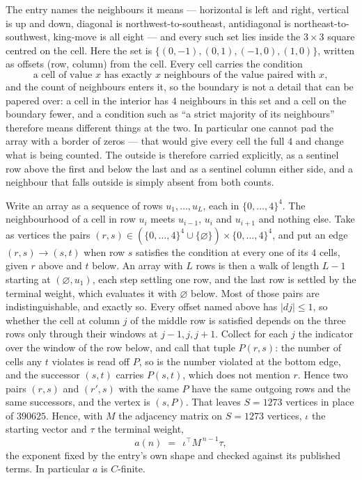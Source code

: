 \documentclass[11pt,a4paper]{article}
\theoremstyle{plain}
\theoremstyle{definition}
\begin{document}
The entry names the neighbours it means --- horizontal is left and right, vertical is up and
down, diagonal is northwest-to-southeast, antidiagonal is northeast-to-southwest, king-move is
all eight --- and every such set lies inside the $3\times3$ square centred on the cell. Here
the set is $\{(0,-1), (0,1), (-1,0), (1,0)\}$, written as offsets (row, column) from the cell. Every cell carries
the condition
\[
\text{a cell of value }x\text{ has exactly }x\text{ neighbours of the value paired with }x,
\]
and the count of neighbours enters it, so the boundary is not a detail that can be papered
over: a cell in the interior has $4$ neighbours in this set and a cell on the boundary
fewer, and a condition such as ``a strict majority of its neighbours'' therefore means
different things at the two. In particular one cannot pad the array with a border of zeros ---
that would give every cell the full $4$ and change what is being counted. The outside is
therefore carried
explicitly, as a sentinel row above the first and below the last and as a sentinel column
either side, and a neighbour that falls outside is simply absent from both counts.

Write an array as a sequence of rows $u_1,\dots,u_L$, each in
$\{0,\dots,4\}^{4}$. The neighbourhood of a cell in row $u_i$ meets $u_{i-1}$,
$u_i$ and $u_{i+1}$ and nothing else. Take as vertices the pairs
$(r,s)\in(\{0,\dots,4\}^{4}\cup\{\varnothing\})\times\{0,\dots,4\}^{4}$,
and put an edge $(r,s)\to(s,t)$ when row $s$ satisfies the condition at every one of its
$4$ cells, given $r$ above and $t$ below. An array with $L$ rows is then a walk of length
$L-1$ starting at $(\varnothing,u_1)$, each step settling one row, and the last row is
settled by the terminal weight, which evaluates it with $\varnothing$ below. Most of those pairs are indistinguishable, and exactly so. Every offset named above has $|dj|\le 1$, so whether the cell at column $j$ of the middle row is satisfied depends on the three rows only through their windows at $j-1,j,j+1$. Collect for each $j$ the indicator over the window of the row below, and call that tuple $P(r,s)$: the number of cells any $t$ violates is read off $P$, so is the number violated at the bottom edge, and the successor $(s,t)$ carries $P(s,t)$, which does not mention $r$. Hence two pairs $(r,s)$ and $(r',s)$ with the same $P$ have the same outgoing rows and the same successors, and the vertex is $(s,P)$. That leaves $S=1273$ vertices in place of $390625$. Hence,
with $M$ the adjacency matrix on $S=1273$ vertices, $\iota$ the starting vector and $\tau$ the
terminal weight,
\[
a(n)\;=\;\,\iota^{\!\top}M^{\,n-1}\tau ,
\]
the exponent fixed by the entry's own shape and checked against its published terms. In
particular $a$ is $C$-finite.
\end{document}
